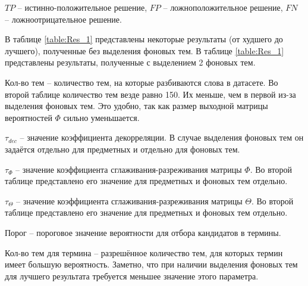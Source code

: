 \documentclass[a4paper, 12pt]{article}
\begin{document}
     $TP$ -- истинно-положительное решение, $FP$ -- ложноположительное решение, $FN$ -- ложноотрицательное решение.

    В таблице \ref{table:Res_1} представлены некоторые результаты (от худшего до лучшего), полученные без выделения фоновых тем. В таблице \ref{table:Res_1} представлены результаты, полученные с выделением 2 фоновых тем.

    Кол-во тем -- количество тем, на которые разбиваются слова в датасете. Во второй таблице количество тем везде равно 150. Их меньше, чем в первой из-за выделения фоновых тем. Это удобно, так как размер выходной матрицы вероятностей $\Phi$ сильно уменьшается.

    $\tau_{dec}$ -- значение коэффициента декорреляции. В случае выделения фоновых тем он задаётся отдельно для предметных и отдельно для фоновых тем.

    $\tau_{\Phi}$ -- значение коэффициента сглаживания-разреживания матрицы $\Phi$. Во второй таблице представлено его значение для предметных и фоновых тем отдельно.

    $\tau_{\Theta}$ -- значение коэффициента сглаживания-разреживания матрицы $\Theta$. Во второй таблице представлено его значение для предметных и фоновых тем отдельно.

    Порог -- пороговое значение вероятности для отбора кандидатов в термины.

    Кол-во тем для термина -- разрешённое количество тем, для которых термин имеет большую вероятность. Заметно, что при наличии выделения фоновых тем для лучшего результата требуется меньшее значение этого параметра.
\end{document}
